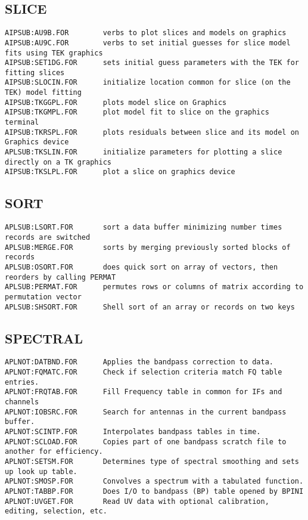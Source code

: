 \subsection{SLICE}
\begin{verbatim}
AIPSUB:AU9B.FOR        verbs to plot slices and models on graphics
AIPSUB:AU9C.FOR        verbs to set initial guesses for slice model fits using TEK graphics
AIPSUB:SET1DG.FOR      sets initial guess parameters with the TEK for fitting slices
AIPSUB:SLOCIN.FOR      initialize location common for slice (on the TEK) model fitting
AIPSUB:TKGGPL.FOR      plots model slice on Graphics
AIPSUB:TKGMPL.FOR      plot model fit to slice on the graphics terminal
AIPSUB:TKRSPL.FOR      plots residuals between slice and its model on Graphics device
APLSUB:TKSLIN.FOR      initialize parameters for plotting a slice directly on a TK graphics
AIPSUB:TKSLPL.FOR      plot a slice on graphics device
\end{verbatim}
 
\subsection{SORT}
\begin{verbatim}
APLSUB:LSORT.FOR       sort a data buffer minimizing number times records are switched
APLSUB:MERGE.FOR       sorts by merging previously sorted blocks of records
APLSUB:OSORT.FOR       does quick sort on array of vectors, then reorders by calling PERMAT
APLSUB:PERMAT.FOR      permutes rows or columns of matrix according to permutation vector
APLSUB:SHSORT.FOR      Shell sort of an array or records on two keys
\end{verbatim}
 
\subsection{SPECTRAL}
\begin{verbatim}
APLNOT:DATBND.FOR      Applies the bandpass correction to data.
APLNOT:FQMATC.FOR      Check if selection criteria match FQ table entries.
APLNOT:FRQTAB.FOR      Fill Frequency table in common for IFs and channels
APLNOT:IOBSRC.FOR      Search for antennas in the current bandpass buffer.
APLNOT:SCINTP.FOR      Interpolates bandpass tables in time.
APLNOT:SCLOAD.FOR      Copies part of one bandpass scratch file to another for efficiency.
APLNOT:SETSM.FOR       Determines type of spectral smoothing and sets up look up table.
APLNOT:SMOSP.FOR       Convolves a spectrum with a tabulated function.
APLNOT:TABBP.FOR       Does I/O to bandpass (BP) table opened by BPINI
APLNOT:UVGET.FOR       Read UV data with optional calibration, editing, selection, etc.
\end{verbatim}
 
